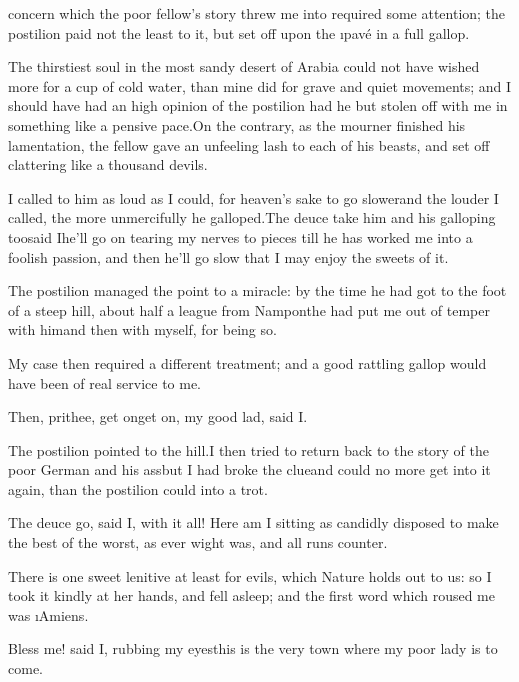 \documentclass[twoside]{article}
\begin{document}


 concern which the poor fellow’s story threw me into required some
attention; the postilion paid not the least to it, but set off upon the
\i{pavé} in a full gallop.

The thirstiest soul in the most sandy desert of Arabia could not have
wished more for a cup of cold water, than mine did for grave and quiet
movements; and I should have had an high opinion of the postilion had he
but stolen off with me in something like a pensive pace.\tsk On the contrary,
as the mourner finished his lamentation, the fellow gave an unfeeling
lash to each of his beasts, and set off clattering like a thousand
devils.

I called to him as loud as I could, for heaven’s sake to go slower\tsk and
the louder I called, the more unmercifully he galloped.\tsk The deuce take
him and his galloping too\tsk said I\tsk he’ll go on tearing my nerves to pieces
till he has worked me into a foolish passion, and then he’ll go slow that
I may enjoy the sweets of it.

The postilion managed the point to a miracle: by the time he had got to
the foot of a steep hill, about half a league from Nampont\tsk he had put me
out of temper with him\tsk and then with myself, for being so.

My case then required a different treatment; and a good rattling gallop
would have been of real service to me.\tsk 

\tsk Then, prithee, get on\tsk get on, my good lad, said I.

The postilion pointed to the hill.\tsk I then tried to return back to the
story of the poor German and his ass\tsk but I had broke the clue\tsk and could
no more get into it again, than the postilion could into a trot.

\tsk The deuce go, said I, with it all!  Here am I sitting as candidly
disposed to make the best of the worst, as ever wight was, and all runs
counter.

There is one sweet lenitive at least for evils, which Nature holds out to
us: so I took it kindly at her hands, and fell asleep; and the first word
which roused me was \i{Amiens}.

\tsk Bless me! said I, rubbing my eyes\tsk this is the very town where my poor
lady is to come.




\end{document}
